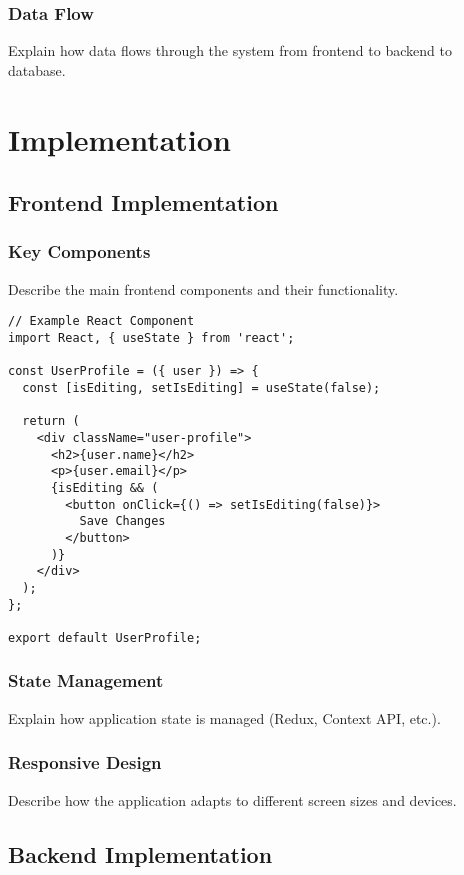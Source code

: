 \documentclass[12pt,a4paper]{article}
\begin{document}
\subsubsection{Data Flow}
Explain how data flows through the system from frontend to backend to database.

\section{Implementation}
\label{sec:implementation}

\subsection{Frontend Implementation}
\subsubsection{Key Components}
Describe the main frontend components and their functionality.

\begin{lstlisting}[caption=Example React Component]
// Example React Component
import React, { useState } from 'react';

const UserProfile = ({ user }) => {
  const [isEditing, setIsEditing] = useState(false);
  
  return (
    <div className="user-profile">
      <h2>{user.name}</h2>
      <p>{user.email}</p>
      {isEditing && (
        <button onClick={() => setIsEditing(false)}>
          Save Changes
        </button>
      )}
    </div>
  );
};

export default UserProfile;
\end{lstlisting}

\subsubsection{State Management}
Explain how application state is managed (Redux, Context API, etc.).

\subsubsection{Responsive Design}
Describe how the application adapts to different screen sizes and devices.

\subsection{Backend Implementation}
\end{document}

